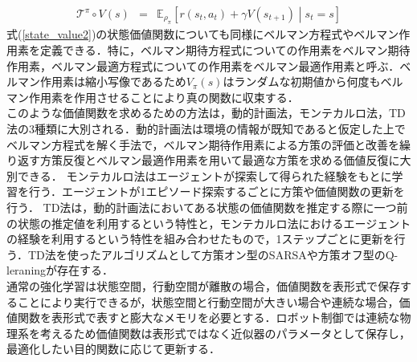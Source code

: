\documentclass[dvipdfmx]{ampbt_nomag}
\begin{document}
\begin{eqnarray} \label{bellman_operator}
  \mathcal{T}^\pi\circ V(s) &=&  \mathbb{E}_{\rho_\pi} \left[ r(s_t,a_t) + \gamma V(s_{t+1}) \middle|s_t = s\right]
\end{eqnarray}
式(\ref{state_value2})の状態価値関数についても同様にベルマン方程式やベルマン作用素を定義できる．特に，ベルマン期待方程式についての作用素をベルマン期待作用素，ベルマン最適方程式についての作用素をベルマン最適作用素と呼ぶ．ベルマン作用素は縮小写像であるため$V_\pi(s)$はランダムな初期値から何度もベルマン作用素を作用させることにより真の関数に収束する．\\
このような価値関数を求めるための方法は，動的計画法，モンテカルロ法，TD法の3種類に大別される．動的計画法は環境の情報が既知であると仮定した上でベルマン方程式を解く手法で，ベルマン期待作用素による方策の評価と改善を繰り返す方策反復とベルマン最適作用素を用いて最適な方策を求める価値反復に大別できる．
モンテカルロ法はエージェントが探索して得られた経験をもとに学習を行う．エージェントが1エピソード探索するごとに方策や価値関数の更新を行う．
TD法は，動的計画法においてある状態の価値関数を推定する際に一つ前の状態の推定値を利用するという特性と，モンテカルロ法におけるエージェントの経験を利用するという特性を組み合わせたもので，1ステップごとに更新を行う．TD法を使ったアルゴリズムとして方策オン型のSARSAや方策オフ型のQ-leraningが存在する．\\
通常の強化学習は状態空間，行動空間が離散の場合，価値関数を表形式で保存することにより実行できるが，状態空間と行動空間が大きい場合や連続な場合，価値関数を表形式で表すと膨大なメモリを必要とする．ロボット制御では連続な物理系を考えるため価値関数は表形式ではなく近似器のパラメータとして保存し，最適化したい目的関数に応じて更新する．
\end{document}
